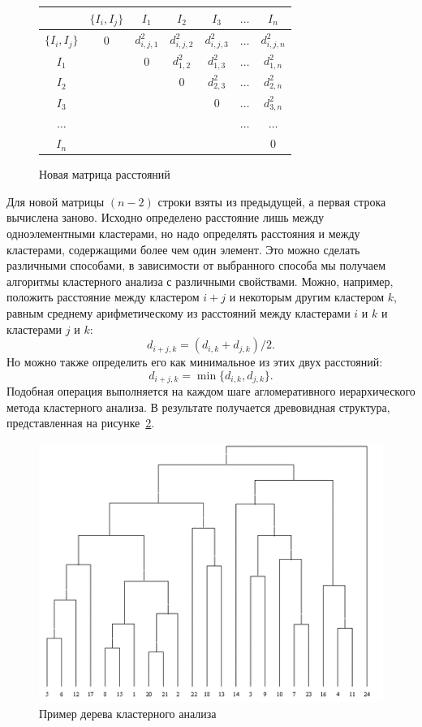 \documentclass[a4paper,14pt,openany,final]{extreport} %
\def\oldcaption{} \let\oldcaption=\caption
\def\caption{\stepcounter{captionsnum}\oldcaption}
\begin{document}
{\begin{figure}[htbp]
  \centering
  \begin{tabular}{|c||c|c|c|c|c|c|}
    \hline
                  & $\{I_i,I_j\}$ & $I_1$         & $I_2$         & $I_3$         & $\ldots$ & $I_n$        \\
    \hline
    \hline
    $\{I_i,I_j\}$ &  0            & $d_{i,j,1}^2$ & $d_{i,j,2}^2$ & $d_{i,j,3}^2$ & $\ldots$ & $d_{i,j,n}^2$  \\
    \hline
    $I_1$ & & 0     & $d_{1,2}^2$ & $d_{1,3}^2$ & $\ldots$ & $d_{1,n}^2$  \\
    \hline
    $I_2$ & &      & 0           & $d_{2,3}^2$ & $\ldots$ & $d_{2,n}^2$  \\
    \hline
    $I_3$ & &      &             & 0           & $\ldots$ & $d_{3,n}^2$  \\
    \hline
 $\ldots$ & &      &             &             & $\ldots$ & $\ldots$ \\
    \hline
    $I_n$ & &      &             &             &          & 0  \\
    \hline
  \end{tabular}
  \caption{Новая матрица расстояний}
  \label{fig:disssimmnew}
\end{figure}
Для новой матрицы $(n-2)$ строки взяты из предыдущей, а первая строка вычислена заново. Исходно определено расстояние лишь между одноэлементными кластерами, но надо определять расстояния и между кластерами, содержащими более чем один элемент. Это можно сделать различными способами, в зависимости от выбранного способа мы получаем алгоритмы кластерного анализа с различными свойствами. Можно, например, положить расстояние между кластером $i + j$ и некоторым другим кластером $k$, равным среднему арифметическому из расстояний между кластерами $i$ и $k$ и кластерами $j$ и $k$:
\[d_{i+j,k}=(d_{i,k}+d_{j,k})/2.\]
Но можно также определить его как минимальное из этих двух расстояний:
\[d_{i+j,k}=\min⁡\{d_{i,k}, d_{j,k}\}.\]
Подобная операция выполняется на каждом шаге агломеративного иерархического метода кластерного анализа. В результате получается древовидная структура, представленная на рисунке~\ref{fig:hclusttree}.

\begin{figure}[htbp]
  \centering
  \includegraphics[width=0.5\linewidth]{hclustexample.png}
  \caption{Пример дерева кластерного анализа \protect\cite{aicourse}}
  \label{fig:hclusttree}
\end{figure}

}
\end{document}
